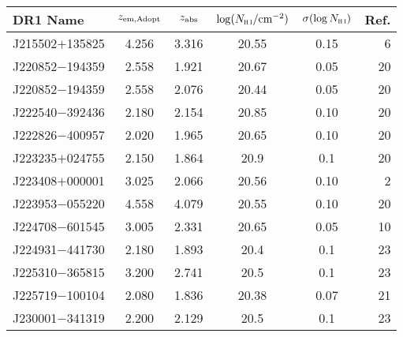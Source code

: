 \begin{table}
\begin{center}
{\footnotesize 
\begin{tabular}{lccccr}
\hline
DR1 Name & $z_{\rm em,Adopt}$ & $z_\textrm{\scriptsize abs}$ & $\log(N_\textsc{h\scriptsize{\,i}}/\textrm{cm}^{-2})$ & $\sigma(\log N_\textsc{h\scriptsize{\,i}})$ & Ref. \\
\hline
 J215502$+$135825 &      4.256 &                    3.316 &                   20.55 &               0.15 &                 6 \\
 J220852$-$194359 &      2.558 &                    1.921 &                   20.67 &               0.05 &                20 \\
 J220852$-$194359 &      2.558 &                    2.076 &                   20.44 &               0.05 &                20 \\
 J222540$-$392436 &      2.180 &                    2.154 &                   20.85 &               0.10 &                20 \\
 J222826$-$400957 &      2.020 &                    1.965 &                   20.65 &               0.10 &                20 \\
 J223235$+$024755 &      2.150 &                    1.864 &                    20.9 &                0.1 &                20 \\
 J223408$+$000001 &      3.025 &                    2.066 &                   20.56 &               0.10 &                 2 \\
 J223953$-$055220 &      4.558 &                    4.079 &                   20.55 &               0.10 &                20 \\
 J224708$-$601545 &      3.005 &                    2.331 &                   20.65 &               0.05 &                10 \\
 J224931$-$441730 &      2.180 &                    1.893 &                    20.4 &                0.1 &                23 \\
 J225310$-$365815 &      3.200 &                    2.741 &                    20.5 &                0.1 &                23 \\
 J225719$-$100104 &      2.080 &                    1.836 &                   20.38 &               0.07 &                21 \\
 J230001$-$341319 &      2.200 &                    2.129 &                    20.5 &                0.1 &                23 \\

\end{tabular}}
\end{center}
\end{table}
